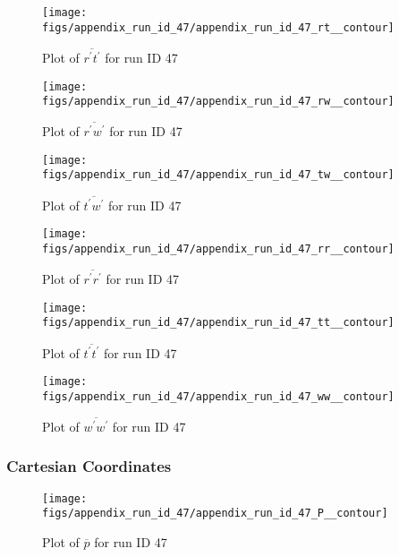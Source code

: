 \begin{figure}[H]
\centering
\texttt{[image: figs/appendix\_run\_id\_47/appendix\_run\_id\_47\_rt\_\_contour]}
\caption{Plot of $\overline{r^\prime t^\prime}$ for run ID 47}
\label{fig:appendix_run_id_47_rt__contour}
\end{figure}


\begin{figure}[H]
\centering
\texttt{[image: figs/appendix\_run\_id\_47/appendix\_run\_id\_47\_rw\_\_contour]}
\caption{Plot of $\overline{r^\prime w^\prime}$ for run ID 47}
\label{fig:appendix_run_id_47_rw__contour}
\end{figure}


\begin{figure}[H]
\centering
\texttt{[image: figs/appendix\_run\_id\_47/appendix\_run\_id\_47\_tw\_\_contour]}
\caption{Plot of $\overline{t^\prime w^\prime}$ for run ID 47}
\label{fig:appendix_run_id_47_tw__contour}
\end{figure}


\begin{figure}[H]
\centering
\texttt{[image: figs/appendix\_run\_id\_47/appendix\_run\_id\_47\_rr\_\_contour]}
\caption{Plot of $\overline{r^\prime r^\prime}$ for run ID 47}
\label{fig:appendix_run_id_47_rr__contour}
\end{figure}


\begin{figure}[H]
\centering
\texttt{[image: figs/appendix\_run\_id\_47/appendix\_run\_id\_47\_tt\_\_contour]}
\caption{Plot of $\overline{t^\prime t^\prime}$ for run ID 47}
\label{fig:appendix_run_id_47_tt__contour}
\end{figure}


\begin{figure}[H]
\centering
\texttt{[image: figs/appendix\_run\_id\_47/appendix\_run\_id\_47\_ww\_\_contour]}
\caption{Plot of $\overline{w^\prime w^\prime}$ for run ID 47}
\label{fig:appendix_run_id_47_ww__contour}
\end{figure}


\subsubsection{Cartesian Coordinates}
\begin{figure}[H]
\centering
\texttt{[image: figs/appendix\_run\_id\_47/appendix\_run\_id\_47\_P\_\_contour]}
\caption{Plot of $\overline{p}$ for run ID 47}
\label{fig:appendix_run_id_47_P__contour}
\end{figure}



